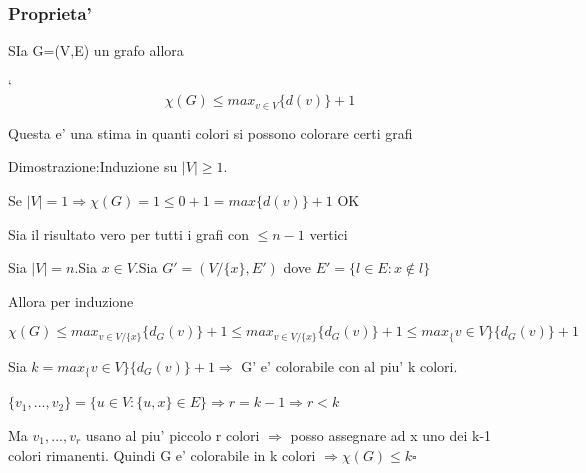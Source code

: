 \documentclass{article}
\begin{document}
        \subsubsection{Proprieta'}
        \begin{flushleft}
          SIa G=(V,E) un grafo allora
        \end{flushleft}`
        \begin{equation*}
          \chi(G) \leq max_{v \in V}\{d(v)\}+1
        \end{equation*}
        \begin{flushleft}
          Questa e' una stima in quanti colori si possono colorare certi grafi
        \end{flushleft}
        \begin{flushleft}
          Dimostrazione:Induzione su $\mid V \mid \geq 1$.
        \end{flushleft}
        \begin{flushleft}
          Se $\mid V \mid =1 \Rightarrow \chi(G)=1 \leq 0+1=max\{d(v)\}+1$ OK
        \end{flushleft}
        \begin{flushleft}
          Sia il risultato vero per tutti i grafi con $\leq n-1$ vertici
        \end{flushleft}
        \begin{flushleft}
          Sia $\mid V \mid =n$.Sia $x\in V$.Sia $G'=(V/\{x\},E')$ dove $E'=\{l\in E: x \notin l\}$
        \end{flushleft}
        \begin{flushleft}
          Allora per induzione
        \end{flushleft}
        \begin{equation*}
          \chi(G)\leq max_{v\in V/\{x\}} \{d_G(v)\}+1\leq max_{v\in V/\{x\}} \{d_G(v)\}+1\leq max_\{v\in V\}\{d_G(v)\}+1
        \end{equation*}
        \begin{flushleft}
          Sia $k=max_\{v\in V\}\{d_G(v)\}+1 \Rightarrow$ G' e' colorabile con al piu' k colori.
        \end{flushleft}
        \begin{flushleft}
          $\{v_1,...,v_2\}=\{u \in V:\{u,x\}\in E\} \Rightarrow r=k-1 \Rightarrow r<k$
        \end{flushleft}
        \begin{flushleft}
          Ma $v_1,...,v_r$ usano al piu' piccolo r colori $\Rightarrow$ posso assegnare ad x uno dei k-1 colori rimanenti. Quindi G e' colorabile in k colori $\Rightarrow \chi(G)\leq k \square$
        \end{flushleft}
\end{document}
